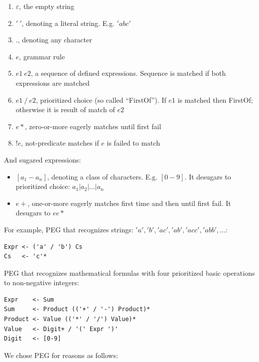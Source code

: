 \documentclass{bmcart}
\begin{document}
\begin{enumerate}
    \item $\varepsilon$, the empty string
    \item $'\ '$, denoting a literal string. E.g. $'abc'$
    \item $.$, denoting any character
    \item $e$, grammar rule
    \item $e1\ e2$, a sequence of defined expressions. Sequence is matched if
    both expressions are matched
    \item $e1\ /\ e2$, prioritized choice (so called ``FirstOf''). If $e1$ is
    matched then FirstOf; otherwise it is result of match of $e2$
    \item $e*$, zero-or-more eagerly matches until first fail
    \item $!e$, not-predicate matches if $e$ is failed to match
\end{enumerate}

And sugared expressions:

\begin{itemize}
    \item $[a_1-a_n]$, denoting a class of characters. E.g.
    $[0-9]$. It desugars to prioritized choice: $a_1 \vert a_2 \vert \ldots
    \vert a_n$
    \item $e+$, one-or-more eagerly matches first time and then until first
    fail. It desugars to $e e*$
\end{itemize}

For example, PEG that recognizes strings: $'a', 'b', 'ac', 'ab', 'acc', 'abb',
\ldots$:

\begin{lstlisting}[frame=single]
Expr <- ('a' / 'b') Cs
Cs   <- 'c'*
\end{lstlisting}

PEG that recognizes mathematical formulas with four prioritized basic
operations to non-negative integers:

\begin{lstlisting}[frame=single]
Expr    <- Sum
Sum     <- Product (('+' / '-') Product)*
Product <- Value (('*' / '/') Value)*
Value   <- Digit+ / '(' Expr ')'
Digit   <- [0-9]
\end{lstlisting}

We chose PEG for reasons as follows:
\end{document}
